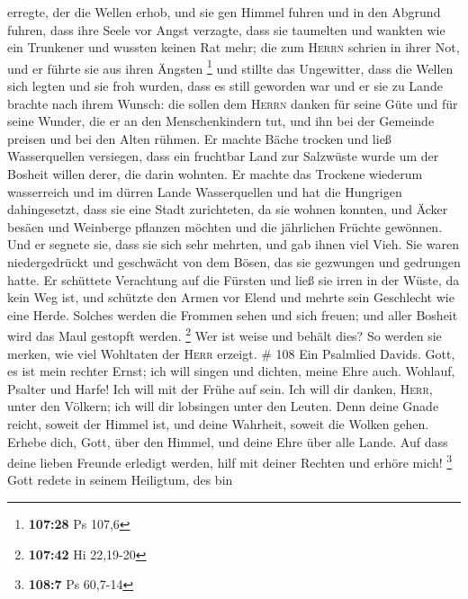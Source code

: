 erregte, der die Wellen erhob,  und sie gen Himmel fuhren
und in den Abgrund fuhren, dass ihre Seele vor Angst verzagte,
 dass sie taumelten und wankten wie ein Trunkener und
wussten keinen Rat mehr;  die zum \textsc{Herrn} schrien
in ihrer Not, und er führte sie aus ihren Ängsten \footnote{\textbf{107:28}
  Ps 107,6}  und stillte das Ungewitter, dass die Wellen
sich legten  und sie froh wurden, dass es still geworden
war und er sie zu Lande brachte nach ihrem Wunsch:  die
sollen dem \textsc{Herrn} danken für seine Güte und für seine Wunder,
die er an den Menschenkindern tut,  und ihn bei der
Gemeinde preisen und bei den Alten rühmen.  Er machte
Bäche trocken und ließ Wasserquellen versiegen,  dass ein
fruchtbar Land zur Salzwüste wurde um der Bosheit willen derer, die
darin wohnten.  Er machte das Trockene wiederum
wasserreich und im dürren Lande Wasserquellen  und hat
die Hungrigen dahingesetzt, dass sie eine Stadt zurichteten, da sie
wohnen konnten,  und Äcker besäen und Weinberge pflanzen
möchten und die jährlichen Früchte gewönnen.  Und er
segnete sie, dass sie sich sehr mehrten, und gab ihnen viel Vieh.
 Sie waren niedergedrückt und geschwächt von dem Bösen,
das sie gezwungen und gedrungen hatte.  Er schüttete
Verachtung auf die Fürsten und ließ sie irren in der Wüste, da kein Weg
ist,  und schützte den Armen vor Elend und mehrte sein
Geschlecht wie eine Herde.  Solches werden die Frommen
sehen und sich freuen; und aller Bosheit wird das Maul gestopft werden.
\footnote{\textbf{107:42} Hi 22,19-20}  Wer ist weise und
behält dies? So werden sie merken, wie viel Wohltaten der \textsc{Herr}
erzeigt. \# 108  Ein Psalmlied Davids. 
Gott, es ist mein rechter Ernst; ich will singen und dichten, meine Ehre
auch.  Wohlauf, Psalter und Harfe! Ich will mit der Frühe
auf sein.  Ich will dir danken, \textsc{Herr}, unter den
Völkern; ich will dir lobsingen unter den Leuten.  Denn
deine Gnade reicht, soweit der Himmel ist, und deine Wahrheit, soweit
die Wolken gehen.  Erhebe dich, Gott, über den Himmel, und
deine Ehre über alle Lande.  Auf dass deine lieben Freunde
erledigt werden, hilf mit deiner Rechten und erhöre mich! \footnote{\textbf{108:7}
  Ps 60,7-14}  Gott redete in seinem Heiligtum, des bin
